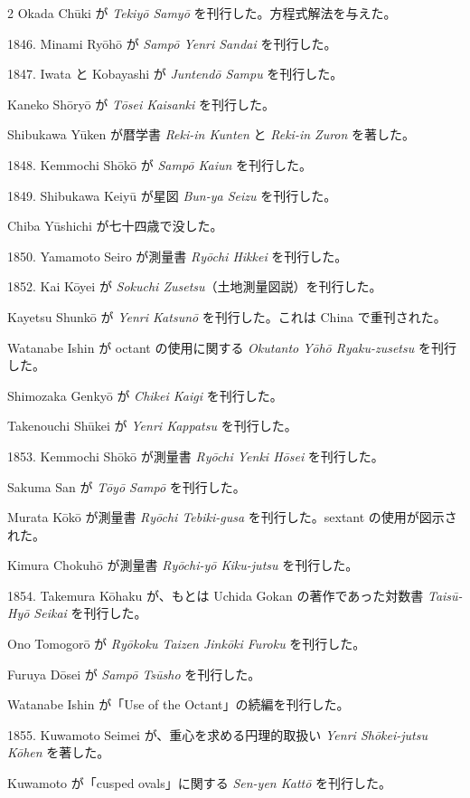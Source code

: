 \documentclass[11pt]{article}
\newcommand{\scanpage}[2]{\clearpage\setcounter{footnote}{0}\noindent{\footnotesize\color{gray}PDF #1 頁 · #2}\par\medskip}
\begin{document}
\scanpage{0204}{第23章年表、印刷頁190}
\begin{multicols}{2}\small
Okada Chūki が \emph{Tekiyō Samyō} を刊行した。方程式解法を与えた。

1846. Minami Ryōhō が \emph{Sampō Yenri Sandai} を刊行した。

1847. Iwata と Kobayashi が \emph{Juntendō Sampu} を刊行した。

Kaneko Shōryō が \emph{Tōsei Kaisanki} を刊行した。

Shibukawa Yūken が暦学書 \emph{Reki-in Kunten} と \emph{Reki-in Zuron} を著した。

1848. Kemmochi Shōkō が \emph{Sampō Kaiun} を刊行した。

1849. Shibukawa Keiyū が星図 \emph{Bun-ya Seizu} を刊行した。

Chiba Yūshichi が七十四歳で没した。

1850. Yamamoto Seiro が測量書 \emph{Ryōchi Hikkei} を刊行した。

1852. Kai Kōyei が \emph{Sokuchi Zusetsu}（土地測量図説）を刊行した。

Kayetsu Shunkō が \emph{Yenri Katsunō} を刊行した。これは China で重刊された。

Watanabe Ishin が octant の使用に関する \emph{Okutanto Yōhō Ryaku-zusetsu} を刊行した。

Shimozaka Genkyō が \emph{Chikei Kaigi} を刊行した。

Takenouchi Shūkei が \emph{Yenri Kappatsu} を刊行した。

1853. Kemmochi Shōkō が測量書 \emph{Ryōchi Yenki Hōsei} を刊行した。

Sakuma San が \emph{Tōyō Sampō} を刊行した。

Murata Kōkō が測量書 \emph{Ryōchi Tebiki-gusa} を刊行した。sextant の使用が図示された。

Kimura Chokuhō が測量書 \emph{Ryōchi-yō Kiku-jutsu} を刊行した。

1854. Takemura Kōhaku が、もとは Uchida Gokan の著作であった対数書 \emph{Taisū-Hyō Seikai} を刊行した。

Ono Tomogorō が \emph{Ryōkoku Taizen Jinkōki Furoku} を刊行した。

Furuya Dōsei が \emph{Sampō Tsūsho} を刊行した。

Watanabe Ishin が「Use of the Octant」の続編を刊行した。

1855. Kuwamoto Seimei が、重心を求める円理的取扱い \emph{Yenri Shōkei-jutsu Kōhen} を著した。

Kuwamoto が「cusped ovals」に関する \emph{Sen-yen Kattō} を刊行した。


\end{multicols}
\end{document}
